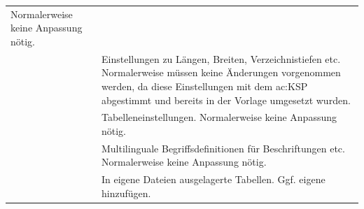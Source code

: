 \begin{longtable}{l@{\extracolsep{8pt}}x}
                                                 Normalerweise keine Anpassung nötig.\\
          & Einstellungen zu Längen, Breiten, Verzeichnistiefen etc.
                                                 Normalerweise müssen keine Änderungen vorgenommen werden, 
                                                 da diese Einstellungen mit dem \gls{ac:KSP} abgestimmt 
                                                 und bereits in der Vorlage umgesetzt wurden.\\
     & Tabelleneinstellungen.
                                                 Normalerweise keine Anpassung nötig.\\
      & Multilinguale Begriffsdefinitionen für Beschriftungen etc.
																				         Normalerweise keine Anpassung nötig.\\
                       & In eigene Dateien ausgelagerte Tabellen.
                                                 Ggf. eigene hinzufügen. \\
\bottomrule%
\end{longtable}%
